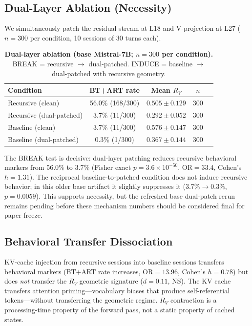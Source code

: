 \documentclass{article}
\newcommand{\RV}{R_V}
\newcommand{\dcohen}{d}
\begin{document}
\subsection{Dual-Layer Ablation (Necessity)}
\label{sec:necessity}

We simultaneously patch the residual stream at L18 and V-projection at L27
($n = 300$ per condition, 10 sessions of 30 turns each).

\begin{table}[h]
\centering
\caption{\textbf{Dual-layer ablation (base Mistral-7B; $n = 300$ per condition).}
         BREAK = recursive $\to$ dual-patched.
         INDUCE = baseline $\to$ dual-patched with recursive geometry.}
\label{tab:duallayer}
\smallskip
\begin{tabular}{lcccc}
\toprule
\textbf{Condition} & \textbf{BT+ART rate} & \textbf{Mean $\RV$} & \textbf{$n$} \\
\midrule
Recursive (clean)       & 56.0\% (168/300) & $0.505 \pm 0.129$ & 300 \\
Recursive (dual-patched) & 3.7\% (11/300) & $0.292 \pm 0.052$ & 300 \\
\midrule
Baseline (clean)        & 3.7\% (11/300)   & $0.576 \pm 0.147$ & 300 \\
Baseline (dual-patched)  & 0.3\% (1/300)    & $0.367 \pm 0.144$ & 300 \\
\bottomrule
\end{tabular}
\end{table}

The BREAK test is decisive: dual-layer patching reduces recursive behavioral
markers from $56.0\%$ to $3.7\%$ (Fisher exact $p = 3.6 \times 10^{-50}$,
OR${=}33.4$, Cohen's $h = 1.31$).
The reciprocal baseline-to-patched condition does not induce recursive behavior; in this
older base artifact it slightly suppresses it ($3.7\% \to 0.3\%$, $p = 0.0059$).
This supports necessity, but the refreshed base dual-patch rerun remains pending before
these mechanism numbers should be considered final for paper freeze.

\subsection{Behavioral Transfer Dissociation}
\label{sec:dissoc_behavioral}

KV-cache injection from recursive sessions into baseline sessions transfers behavioral markers
(BT+ART rate increases, OR${}= 13.96$, Cohen's $h = 0.78$) but does \emph{not} transfer the
$\RV$ geometric signature ($\dcohen = 0.11$, NS).
The KV cache transfers attention priming---vocabulary biases that produce self-referential
tokens---without transferring the geometric regime.
$\RV$ contraction is a processing-time property of the forward pass, not a static property
of cached states.
\end{document}
